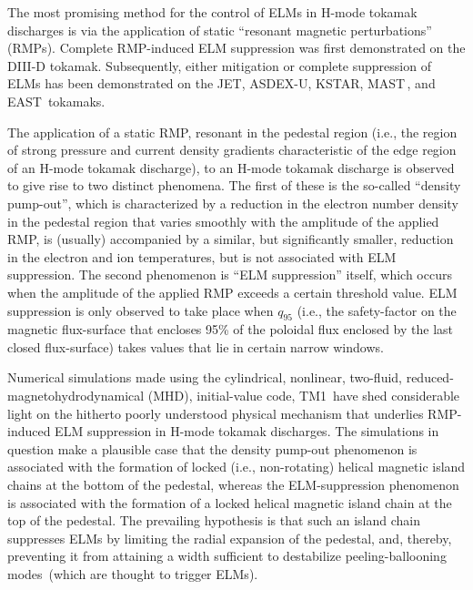 \documentclass[12pt,prb,aps]{revtex4-1}
\begin{document}
The most promising method for the control of ELMs in H-mode tokamak discharges is via the application of static   ``resonant magnetic perturbations'' (RMPs). Complete RMP-induced 
ELM suppression was first demonstrated on the DIII-D tokamak.\cite{evans} Subsequently, either mitigation or complete suppression of
ELMs has been demonstrated on the JET,\cite{jet} ASDEX-U,\cite{asdex} KSTAR,\cite{kstar} MAST\,\cite{mast}, and EAST\,\cite{east} tokamaks.

The application of a static RMP, resonant in the pedestal region (i.e., the region of strong pressure and current density gradients characteristic of the edge region of an H-mode 
tokamak discharge), to an H-mode tokamak discharge is observed to give rise to  two distinct phenomena.\cite{schmitz, lanctot,paz1,d158115,lyons,paz} The first of these  is the 
so-called ``density pump-out'', which  is characterized by a reduction in the electron number density
in the pedestal region that varies smoothly with the amplitude of the applied RMP,  is (usually) accompanied by a similar, but significantly smaller, reduction
in the electron and ion temperatures, but  is not associated with ELM suppression. The second phenomenon is  ``ELM suppression'' itself, which 
 occurs when the amplitude of the applied RMP exceeds a certain threshold value. 
ELM suppression  is only observed to take place when $q_{95}$ (i.e., the safety-factor on the magnetic flux-surface that encloses 95\% of the poloidal flux enclosed by
the last closed flux-surface) takes values that lie in certain narrow windows. \cite{paz1,d158115}

Numerical simulations made using the cylindrical,  nonlinear, two-fluid, reduced-magneto\-hydro\-dynamical (MHD), initial-value code, TM1\,\cite{tm1,tm2,tm3} have shed considerable 
light on the hitherto poorly understood  physical mechanism that underlies RMP-induced ELM
suppression in H-mode tokamak discharges.\cite{hu} The simulations  in question make a plausible case  that the density  pump-out  phenomenon is associated with the formation of   
locked (i.e., non-rotating) helical magnetic
island chains at the bottom of the pedestal, whereas the ELM-suppression phenomenon is associated with the formation of a locked helical magnetic island chain at the
top of the pedestal. The prevailing hypothesis is that such an island chain suppresses ELMs by limiting the radial expansion of the
pedestal, and, thereby, preventing it from attaining a width sufficient to destabilize peeling-ballooning modes\,\cite{connor}  (which are thought to trigger ELMs).\cite{d3d}
\end{document}
